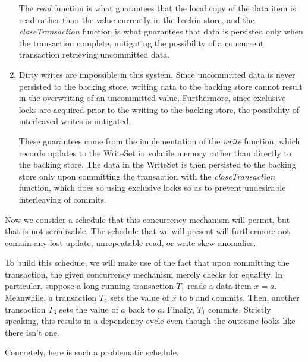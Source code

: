 \documentclass{article}
\begin{document}
\begin{enumerate}
        The \emph{read} function is what guarantees that the local copy of the
        data item is read rather than the value currently in the backin store,
        and the \emph{closeTransaction} function is what guarantees that data
        is persisted only when the transaction complete, mitigating the
        possibility of a concurrent transaction retrieving uncommitted data.

    \item
        Dirty writes are impossible in this system. Since uncommitted data is
        never persisted to the backing store, writing data to the backing store
        cannot result in the overwriting of an uncommitted value. Furthermore,
        since exclusive locks are acquired prior to the writing to the backing
        store, the possibility of interleaved writes is mitigated.

        These guarantees come from the implementation of the \emph{write}
        function, which records updates to the WriteSet in volatile memory
        rather than directly to the backing store. The data in the WriteSet is
        then persisted to the backing store only upon committing the
        transaction with the \emph{closeTransaction} function, which does so
        using exclusive locks so as to prevent undesirable interleaving of
        commits.
\end{enumerate}

Now we consider a schedule that this concurrency mechanism will permit, but
that is not serializable. The schedule that we will present will furthermore
not contain any lost update, unrepeatable read, or write skew anomalies.

To build this schedule, we will make use of the fact that upon committing the
transaction, the given concurrency mechanism merely checks for equality. In
particular, suppose a long-running transaction $T_1$ reads a data item $x = a$.
Meanwhile, a transaction $T_2$ sets the value of $x$ to $b$ and commits. Then,
another transaction $T_3$ sets the value of $a$ back to $a$. Finally, $T_1$
commits. Strictly speaking, this results in a dependency cycle even though the
outcome looks like there isn't one.

Concretely, here is such a problematic schedule.
\end{document}
